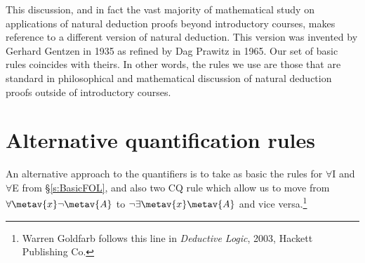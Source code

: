 This discussion, and in fact the vast majority of mathematical study on applications of natural deduction proofs beyond introductory courses, makes reference to a different version of natural deduction. This version was invented by Gerhard Gentzen in 1935 as refined by Dag Prawitz in 1965. Our set of basic rules coincides with theirs. In other words, the rules we use are those that are standard in philosophical and mathematical discussion of natural deduction proofs outside of introductory courses.



\section{Alternative quantification rules}
An alternative approach to the quantifiers is to take as basic the rules for $\forall$I and $\forall$E from \S\ref{s:BasicFOL}, and also two CQ rule which allow us to move from $\forall \metav{x} \enot \metav{A}$ to $\enot \exists \metav{x} \metav{A}$ and vice versa.\footnote{Warren Goldfarb follows this line in \emph{Deductive Logic}, 2003, Hackett Publishing Co.}  

